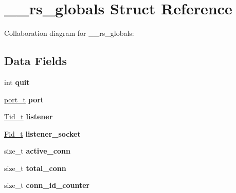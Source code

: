 \hypertarget{struct____rs__globals}{}\section{\+\_\+\+\_\+rs\+\_\+globals Struct Reference}
\label{struct____rs__globals}


Collaboration diagram for \+\_\+\+\_\+rs\+\_\+globals\+:
\subsection*{Data Fields}
\begin{DoxyCompactItemize}
\item 
\mbox{\label{struct____rs__globals_a883fedeeb83e8f30d55072af301365a4}} 
int {\bfseries quit}
\item 
\mbox{\label{struct____rs__globals_a6dc49afd76e2743a62e0a467ab5af41b}} 
\hyperlink{group__syscalls_ga13894e5a2ffd5febb7aeb90e87239d61}{port\+\_\+t} {\bfseries port}
\item 
\mbox{\label{struct____rs__globals_afc8fa99b7b3fcee63f780cc0e3690ebf}} 
\hyperlink{group__syscalls_gaf67ad1c55e6b2a79bf8a99106380ce01}{Tid\+\_\+t} {\bfseries listener}
\item 
\mbox{\label{struct____rs__globals_a7f274f9a80478d9b33b743e1432f2438}} 
\hyperlink{group__syscalls_ga5097222c5f0da97d92d4712359abc38f}{Fid\+\_\+t} {\bfseries listener\+\_\+socket}
\item 
\mbox{\label{struct____rs__globals_ad1be788d826e6e30ab8df0f12d6a53a3}} 
size\+\_\+t {\bfseries active\+\_\+conn}
\item 
\mbox{\label{struct____rs__globals_ad4f03cddafaa93561024a6ab26c937d3}} 
size\+\_\+t {\bfseries total\+\_\+conn}
\item 
\mbox{\label{struct____rs__globals_a914de4c47a4da5f5df4fa5c4a1de899b}} 
size\+\_\+t {\bfseries conn\+\_\+id\+\_\+counter}
\item 
\mbox{\label{struct____rs__globals_a8578087e09ae301d77b81dd2b5a661fa}} 

\end{DoxyCompactItemize}
